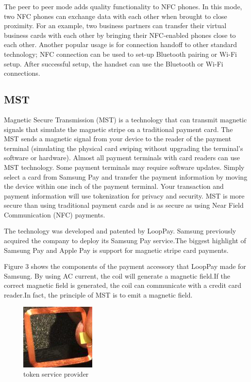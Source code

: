 \documentclass[journal]{IEEEtran}
\begin{document}
The peer to peer mode adds quality functionality to NFC phones. In this mode, two NFC phones can exchange data with each other when brought to close proximity. For an example, two business partners can transfer their virtual business cards with each other by bringing their NFC-enabled phones close to
each other. Another popular usage is for connection handoff to other standard technology; NFC connection can be used to set-up Bluetooth pairing or Wi-Fi setup. After successful setup, the handset can use the Bluetooth or Wi-Fi connections.


\subsection{MST}
Magnetic Secure Transmission (MST) is a technology that can transmit magnetic signals that simulate the magnetic stripe on a traditional payment card. The MST sends a magnetic signal from your device to the reader of the payment terminal (simulating the physical card swiping without upgrading the terminal's software or hardware). Almost all payment terminals with card readers can use MST technology. Some payment terminals may require software updates. Simply select a card from Samsung Pay and transfer the payment information by moving the device within one inch of the payment terminal. Your transaction and payment information will use tokenization for privacy and security. MST is more secure than using traditional payment cards and is as secure as using Near Field Communication (NFC) payments.

The technology was developed and patented by LoopPay. Samsung previously acquired the company to deploy its Samsung Pay service.The biggest highlight of Samsung Pay and Apple Pay is support for magnetic stripe card payments.

Figure 3 shows the components of the payment accessory that LoopPay made for Samsung. By using AC current, the coil will generate a magnetic field.If the correct magnetic field is generated, the coil can communicate with a credit card reader.In fact, the principle of MST is to emit a magnetic field.

\begin{figure}[htbp]
\centerline{\includegraphics[scale=1]{MSTyuanjian2.png}}
\caption{token service provider}
\label{fig}
\end{figure}
\end{document}
